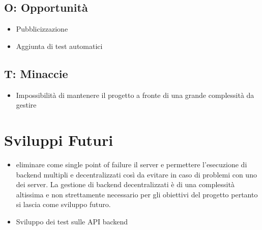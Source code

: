\documentclass[11pt]{article}
\begin{document}
\subsection{O: Opportunità}
\begin{itemize}
	\item Pubblicizzazione
	\item Aggiunta di test automatici
\end{itemize}
\subsection{T: Minaccie}
\begin{itemize}
	\item Impossibilità di mantenere il progetto a fronte di una grande complessità da gestire
\end{itemize}
\section{Sviluppi Futuri}
\begin{itemize}
	\item eliminare come single point of failure il server e permettere l'esecuzione di backend multipli e decentralizzati così da evitare in caso di problemi con uno dei server. La gestione di backend decentralizzati è di una complessità altissima e non strettamente necessario per gli obiettivi del progetto pertanto si lascia come sviluppo futuro.
	\item Sviluppo dei test sulle API backend
\end{itemize}
\end{document}
